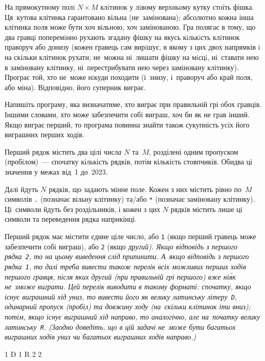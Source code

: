 ﻿На прямокутному полi $N{\times}M$ клiтинок у лiвому верхньому кутку стоїть фішка. Ця~кутова клітинка гарантовано вільна (не~замінована); абсолютно кожна інша клітинка п{\it о}ля може бути хоч вільною, хоч замінованою. 
Гра полягає в тому, що два гравцi поперемiнно рухають згадану фішку на якусь кiлькiсть клiтинок праворуч або донизу (кожен гравець сам вирiшує, в якому з цих двох напрямків i на скільки клітинок рухати; не~можна ні~лишати фішку на мiсцi, ні~ставати нею в заміновану клітинку, ні~перестрибувати нею через заміновану клітинку).
Програє той, хто не~може нiкуди походити (і~знизу, і~праворуч або край п{\it о}ля, або міна). Відповідно, його суперник виграє.

Напишіть програму, яка визначатиме, хто виграє при правильній грі обох гравців. 
Іншими словами, хто може забезпечити собі виграш, хоч би як не грав інший.
Якщо виграє перший, то програма повинна знайти також сукупність усіх його виграшних перших ходів.

\InputFile
Перший рядок містить два цілі числ{\it а} $N$ та~$M$, розділені одним пропуском (пробілом)~--- спочатку кількість рядків, потім кількість стовпчиків. Обидва ці значення у межах від~1 до~2023.

Далі йдуть $N$ рядків, що задають мінне поле. Кожен з них містить рівно по~$M$ символів \texttt{.} (позначає вільну клітинку) та/або \texttt{*} (позначає заміновану клітинку). Ці~символи йдуть без роздільників, і кожен з цих $N$ рядків містить лише ці символи та переведення рядка наприкінці.

\OutputFile
Перший рядок має містити єдине ціле число, або \texttt{1} (якщо перший гравець може забезпечити собі виграш), або \texttt{2} (якщо др\it{у}гий). Якщо відповідь з першого рядка~\texttt{2}, то на цьому виведення слід припинити. А~якщо відповідь з першого рядка~\texttt{1}, то далі треба вивести також перелік всіх можливих перших ходів першого гравця, після яких др\it{у}гий (при правильній грі першого) вже ні\'{я}к не~зможе виграти. Цей перелік виводити в такому форматі: спочатку, якщо існує виграшний хід униз, то вивести його як велику латинську літеру~\texttt{D}, одинарний пропуск (пробіл) та довжину ходу (на~скільки клітинок іти вниз); потім, якщо існує виграшний хід направо, то аналогічно, але на~початку велику латинську~\texttt{R}. (Заодно {\it доведіть}, що в цій задачі не~може бути багатьох виграшних ходів униз чи багатьох виграшних ходів направо.)

\Examples
\begin{example}
{1
D 1
R 2
}
{2
}
\end{example}

